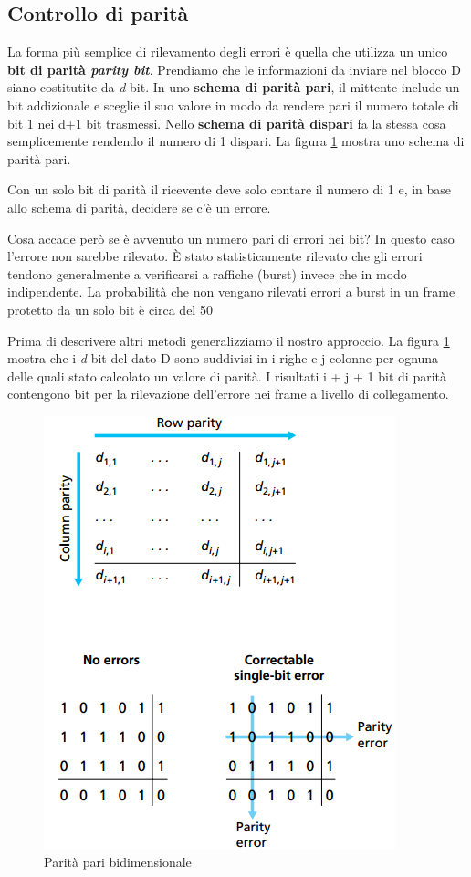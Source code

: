 \documentclass[11pt,a4paper]{book}
\begin{document}
\subsection{Controllo di parità}
La forma più semplice di rilevamento degli errori è quella che utilizza un unico \textbf{bit di parità \textit{parity bit}}. Prendiamo che le informazioni da inviare nel blocco D siano costitutite da \emph{d} bit. In uno \textbf{schema di parità pari}, il mittente include un bit addizionale e sceglie il suo valore in modo da rendere pari il numero totale di bit 1 nei d+1 bit trasmessi. Nello \textbf{schema di parità dispari} fa la stessa cosa semplicemente rendendo il numero di 1 dispari. La figura \ref{fig: 072} mostra uno schema di parità pari.

Con un solo bit di parità il ricevente deve solo contare il numero di 1 e, in base allo schema di parità, decidere se c'è un errore.

Cosa accade però se è avvenuto un numero pari di errori nei bit? In questo caso l'errore non sarebbe rilevato. È stato statisticamente rilevato che gli errori tendono generalmente a verificarsi a raffiche (burst) invece che in modo indipendente. La probabilità che non vengano rilevati errori a burst in un frame protetto da un solo bit è circa del 50%

Prima di descrivere altri metodi generalizziamo il nostro approccio. La figura \ref{fig: 072} mostra che i \emph{d} bit del dato D sono suddivisi in i righe e j colonne per ognuna delle quali  stato calcolato un valore di parità. I risultati i + j + 1 bit di parità contengono bit per la rilevazione dell'errore nei frame a livello di collegamento.
\begin{figure}
	\begin{center}
		\includegraphics[scale=0.5]{img/072.png}
		\caption{Parità pari bidimensionale}
		\label{fig: 072}
	\end{center}
\end{figure}
\end{document}
